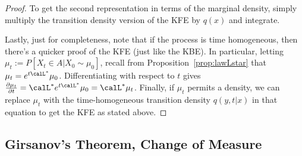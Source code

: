 \documentclass[12pt]{article}
\theoremstyle{plain}
\theoremstyle{definition}
\theoremstyle{remark}
\begin{document}
\begin{proof}
To get the second representation in terms of the marginal density,
simply multiply the transition density version of the KFE by $q(x)$ and
integrate.

Lastly, just for completeness, note that if the process is time
homogeneous, then there's a quicker proof of the KFE (just like the
KBE). In particular, letting $\mu_t:=P[X_t\in A|X_0\sim \mu_0]$, recall
from Proposition~\ref{prop:lawLstar} that $\mu_t=e^{t\calL^*}\mu_0$.
Differentiating with respect to $t$ gives
$\frac{\partial \mu_t}{\partial t} = \calL^* e^{t\calL^*}\mu_0 = \calL^*
\mu_t$.
Finally, if $\mu_t$ permits a density, we can replace $\mu_t$ with the
time-homogeneous transition density $q(y,t|x)$ in that equation to get
the KFE as stated above.
\end{proof}



\clearpage
\subsection{Girsanov's Theorem, Change of Measure}
\end{document}
